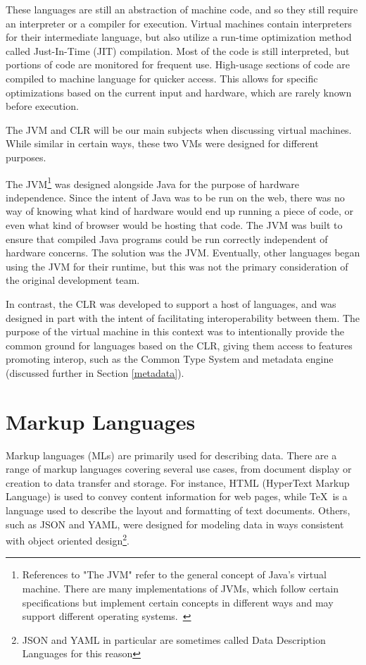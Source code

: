\documentclass{sig-alternate}
\begin{document}
These languages are still an abstraction of machine code, and so they still require an interpreter or a compiler for execution.
Virtual machines contain interpreters for their intermediate language, but also utilize a run-time optimization method called Just-In-Time (JIT) compilation. Most of the code is still interpreted, but portions of code are monitored for frequent use. High-usage sections of code are compiled to machine language for quicker access. This allows for specific optimizations based on the current input and hardware, which are rarely known before execution.~\cite{wiki:JIT}



The JVM and CLR will be our main subjects when discussing virtual machines. While similar in certain ways, these two VMs were designed for different purposes.

The JVM\footnote{References to "The JVM" refer to the general concept of Java's virtual machine. There are many implementations of JVMs, which follow certain specifications but implement certain concepts in different ways and may support different operating systems.~\cite{wiki:multiJVM, wiki:JVM}}
was designed alongside Java for the purpose of hardware independence. Since the intent of Java was to be run on the web, there was no way of knowing what kind of hardware would end up running a piece of code, or even what kind of browser would be hosting that code. The JVM was built to ensure that compiled Java programs could be run correctly independent of hardware concerns. The solution was the JVM. Eventually, other languages began using the JVM for their runtime, but this was not the primary consideration of the original development team.

In contrast, the CLR was developed to support a host of languages, and was designed in part with the intent of facilitating interoperability between them. The purpose of the virtual machine in this context was to intentionally provide the common ground for languages based on the CLR, giving them access to features promoting interop, such as the Common Type System and metadata engine (discussed further in Section \ref{metadata}).


\section{Markup Languages}\label{ML}
Markup languages (MLs) are primarily used for describing data. There are a range of markup languages covering several use cases, from document display or creation to data transfer and storage. For instance, HTML (HyperText Markup Language) is used to convey content information for web pages, while \TeX~is a language used to describe the layout and formatting of text documents.
Others, such as JSON and YAML, were designed for modeling data in ways consistent with object oriented design\footnote{JSON and YAML in particular are sometimes called Data Description Languages for this reason}. 
\end{document}
